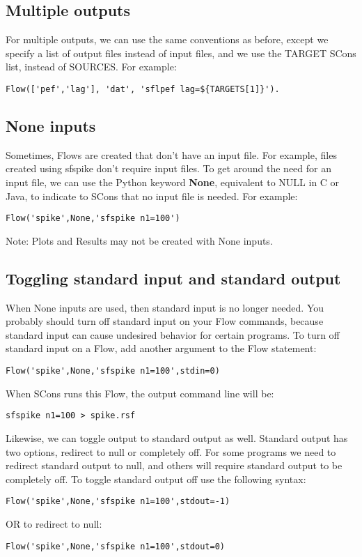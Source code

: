 \subsection{Multiple outputs}

For multiple outputs, we can use the same conventions as before, except we specify a list of output files instead of input files, and we use the TARGET SCons list, instead of SOURCES.  For example:
\begin{verbatim}
Flow(['pef','lag'], 'dat', 'sflpef lag=${TARGETS[1]}').
\end{verbatim}

\subsection{None inputs}

Sometimes, Flows are created that don't have an input file.  For example, files created using sfspike don't require input files.  To get around the need for an input file, we can use the Python keyword \textbf{None}, equivalent to NULL in C or Java, to indicate to SCons that no input file is needed.  For example:
\begin{verbatim}
Flow('spike',None,'sfspike n1=100')
\end{verbatim}
Note:  Plots and Results may not be created with None inputs.

\subsection{Toggling standard input and standard output}
When None inputs are used, then standard input is no longer needed.  You probably should turn off standard input on your Flow commands, because standard input can cause undesired behavior for certain programs.  To turn off standard input on a Flow, add another argument to the Flow statement:
\begin{verbatim}
Flow('spike',None,'sfspike n1=100',stdin=0)
\end{verbatim}
When SCons runs this Flow, the output command line will be:
\begin{verbatim}
sfspike n1=100 > spike.rsf
\end{verbatim}
Likewise, we can toggle output to standard output as well.  Standard output has two options, redirect to null or completely off.  For some programs we need to redirect standard output to null, and others will require standard output to be completely off.  To toggle standard output off use the following syntax:
\begin{verbatim}
Flow('spike',None,'sfspike n1=100',stdout=-1)
\end{verbatim}
OR to redirect to null:
\begin{verbatim}
Flow('spike',None,'sfspike n1=100',stdout=0)
\end{verbatim}

